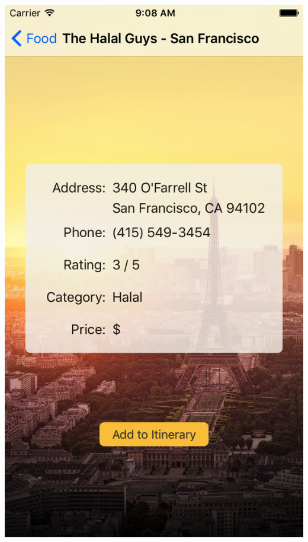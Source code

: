 \documentclass{beamer}
\begin{document}
\begin{frame}
\begin{columns}
\begin{column}{0.3\textwidth}
\begin{center}
            \includegraphics[scale=0.14]{foodDetail}
        \end{center}
    \end{column}
\end{columns}
\end{frame}
\end{document}
